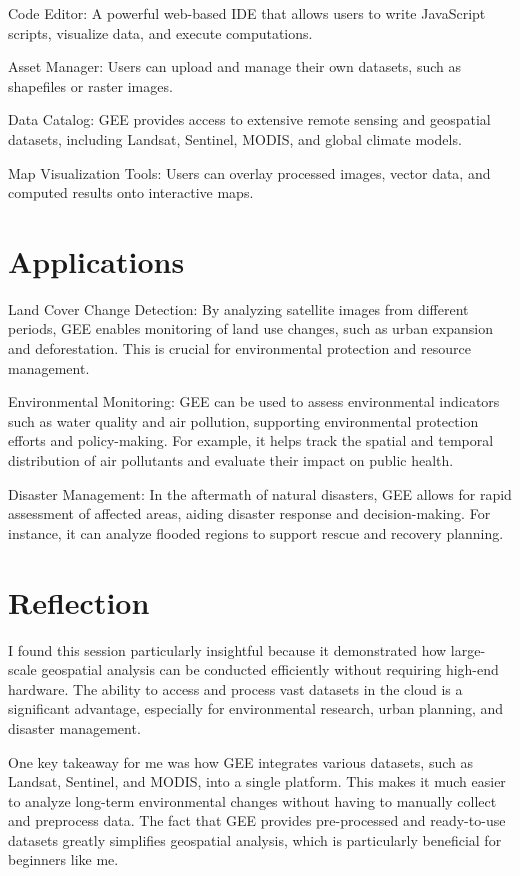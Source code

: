 \documentclass[
  letterpaper,
]{scrbook}
\begin{document}
Code Editor: A powerful web-based IDE that allows users to write
JavaScript scripts, visualize data, and execute computations.

Asset Manager: Users can upload and manage their own datasets, such as
shapefiles or raster images.

Data Catalog: GEE provides access to extensive remote sensing and
geospatial datasets, including Landsat, Sentinel, MODIS, and global
climate models.

Map Visualization Tools: Users can overlay processed images, vector
data, and computed results onto interactive maps.

\section{Applications}\label{applications-3}

Land Cover Change Detection: By analyzing satellite images from
different periods, GEE enables monitoring of land use changes, such as
urban expansion and deforestation. This is crucial for environmental
protection and resource management.

Environmental Monitoring: GEE can be used to assess environmental
indicators such as water quality and air pollution, supporting
environmental protection efforts and policy-making. For example, it
helps track the spatial and temporal distribution of air pollutants and
evaluate their impact on public health.

Disaster Management: In the aftermath of natural disasters, GEE allows
for rapid assessment of affected areas, aiding disaster response and
decision-making. For instance, it can analyze flooded regions to support
rescue and recovery planning.

\section{Reflection}\label{reflection-3}

I found this session particularly insightful because it demonstrated how
large-scale geospatial analysis can be conducted efficiently without
requiring high-end hardware. The ability to access and process vast
datasets in the cloud is a significant advantage, especially for
environmental research, urban planning, and disaster management.

One key takeaway for me was how GEE integrates various datasets, such as
Landsat, Sentinel, and MODIS, into a single platform. This makes it much
easier to analyze long-term environmental changes without having to
manually collect and preprocess data. The fact that GEE provides
pre-processed and ready-to-use datasets greatly simplifies geospatial
analysis, which is particularly beneficial for beginners like me.
\end{document}
